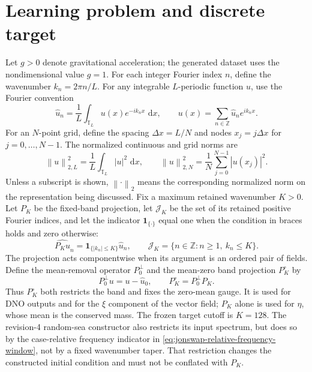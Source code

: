\documentclass[11pt]{article}
\newcommand{\T}{\mathbb T}
\newcommand{\dd}{\,\mathrm d}
\newcommand{\norm}[1]{\left\lVert #1\right\rVert}
\begin{document}
\section{Learning problem and discrete target}
\label{sec:target}

Let $g>0$ denote gravitational acceleration; the generated dataset uses the
nondimensional value $g=1$.  For each integer Fourier index $n$, define the
wavenumber $k_n=2\pi n/L$.  For any integrable $L$-periodic function $u$, use
the Fourier convention
\begin{equation}
  \widehat u_n=\frac1L\int_{\T_L}u(x)e^{-ik_nx}\,\dd x,
  \qquad
  u(x)=\sum_{n\in\mathbb Z}\widehat u_ne^{ik_nx}.
  \label{eq:fourier-convention}
\end{equation}
For an $N$-point grid, define the spacing $\Delta x=L/N$ and nodes
$x_j=j\Delta x$ for $j=0,\ldots,N-1$.  The normalized continuous and grid
norms are
\begin{equation}
  \norm{u}_{2,L}^2=\frac1L\int_{\T_L}|u|^2\,\dd x,
  \qquad
  \norm{u}_{2,N}^2=\frac1N\sum_{j=0}^{N-1}|u(x_j)|^2.
  \label{eq:l2-conventions}
\end{equation}
Unless a subscript is shown, $\norm{\cdot}_2$ means the corresponding
normalized norm on the representation being discussed.  Fix a maximum
retained wavenumber $K>0$.  Let $P_K$ be the fixed-band projection, let
$\mathcal J_K$ be the set of its retained positive Fourier indices, and let
the indicator $\mathbf 1_{\{\cdot\}}$ equal one when the condition in braces
holds and zero otherwise:
\begin{equation}
  \widehat{P_Ku}_n=\mathbf 1_{\{|k_n|\leq K\}}\widehat u_n,
  \qquad
  \mathcal J_K=\{n\in\mathbb Z:n\geq1,\ k_n\leq K\}.
  \label{eq:fixed-band-projection}
\end{equation}
The projection acts componentwise when its argument is an ordered pair of
fields.
Define the mean-removal operator $P_0^\perp$ and the mean-zero band
projection $P_K^\circ$ by
\begin{equation}
  P_0^\perp u=u-\widehat u_0,\qquad
  P_K^\circ=P_0^\perp P_K.
  \label{eq:mean-zero-band-projection}
\end{equation}
Thus $P_K^\circ$ both restricts the band and fixes the zero-mean gauge.  It is
used for DNO outputs and for the $\xi$ component of the vector field; $P_K$
alone is used for $\eta$, whose mean is the conserved mass.
The frozen target cutoff is $K=128$.  The revision-4 random-sea constructor
also restricts its input spectrum, but does so by the case-relative frequency
indicator in \eqref{eq:jonswap-relative-frequency-window}, not by a fixed
wavenumber taper.  That restriction changes the constructed initial
condition and must not be conflated with $P_K$.
\end{document}
